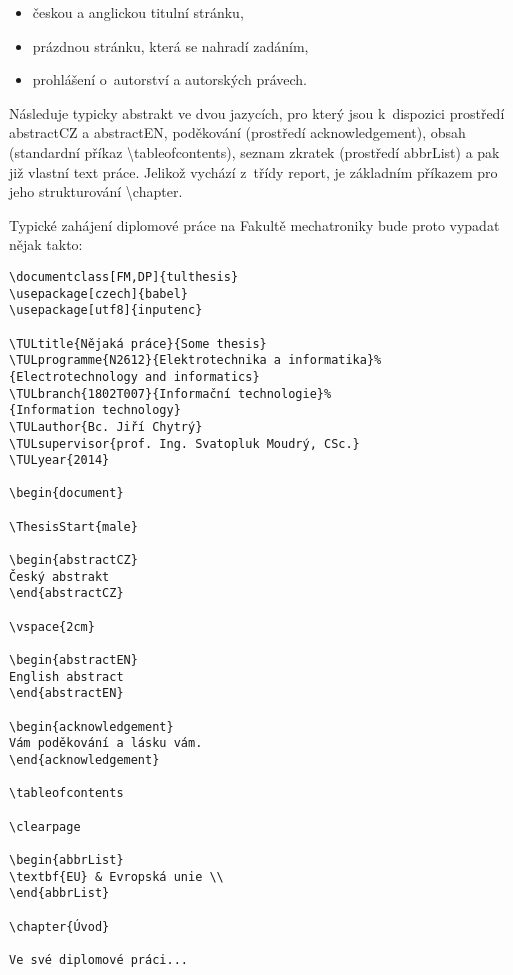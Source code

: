 \documentclass[FM,DP]{tulthesis}
\newcommand{\argument}[1]{{\ttfamily\color{\tulcolor}#1}}
\newcommand{\prikaz}[1]{\argument{\textbackslash #1}}
\newenvironment{myquote}{\begin{list}{}{\setlength\leftmargin\parindent}\item[]}{\end{list}}
\newenvironment{listing}{\begin{myquote}\color{\tulcolor}}{\end{myquote}}
\begin{document}
\begin{itemize}
\item českou a anglickou titulní stránku,
\item prázdnou stránku, která se nahradí zadáním,
\item prohlášení o~autorství a autorských právech.
\end{itemize}

Následuje typicky abstrakt ve dvou jazycích, pro který jsou k~dispozici
prostředí \argument{abstractCZ} a \argument{abstractEN}, poděkování (prostředí
\argument{acknowledgement}), obsah (standardní příkaz
\prikaz{tableofcontents}), seznam zkratek (prostředí \argument{abbrList})
a pak již vlastní text práce. Jelikož vychází z~třídy \argument{report}, je
základním příkazem pro jeho strukturování \prikaz{chapter}.

Typické zahájení diplomové práce na Fakultě mechatroniky bude proto vypadat
nějak takto:

\begin{listing}
\begin{verbatim}
\documentclass[FM,DP]{tulthesis}
\usepackage[czech]{babel}
\usepackage[utf8]{inputenc}

\TULtitle{Nějaká práce}{Some thesis}
\TULprogramme{N2612}{Elektrotechnika a informatika}%
{Electrotechnology and informatics}
\TULbranch{1802T007}{Informační technologie}%
{Information technology}
\TULauthor{Bc. Jiří Chytrý}
\TULsupervisor{prof. Ing. Svatopluk Moudrý, CSc.}
\TULyear{2014}

\begin{document}

\ThesisStart{male}

\begin{abstractCZ}
Český abstrakt
\end{abstractCZ}

\vspace{2cm}

\begin{abstractEN}
English abstract
\end{abstractEN}

\begin{acknowledgement}
Vám poděkování a lásku vám.
\end{acknowledgement}

\tableofcontents

\clearpage

\begin{abbrList}
\textbf{EU} & Evropská unie \\
\end{abbrList}

\chapter{Úvod}

Ve své diplomové práci...
\end{verbatim}
\end{listing}
\end{document}
